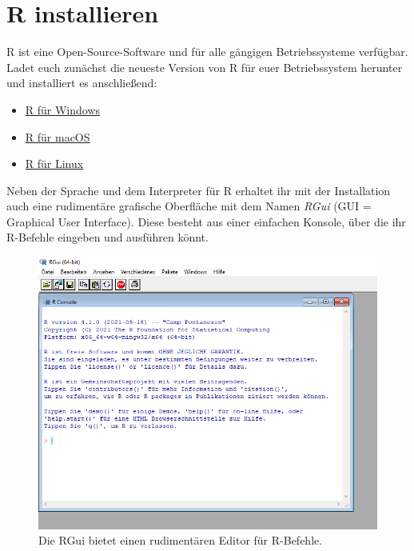 \documentclass[
]{book}
\providecommand{\tightlist}{%
  \setlength{\itemsep}{0pt}\setlength{\parskip}{0pt}}
\begin{document}
\hypertarget{r-installieren}{%
\section{R installieren}\label{r-installieren}}

R ist eine Open-Source-Software und für alle gängigen Betriebssysteme verfügbar. Ladet euch zunächst die neueste Version von R für euer Betriebssystem herunter und installiert es anschließend:

\begin{itemize}
\tightlist
\item
  \href{https://cran.r-project.org/bin/windows/base/}{R für Windows}
\item
  \href{https://cran.r-project.org/bin/macosx/}{R für macOS}
\item
  \href{https://cran.r-project.org/bin/linux/}{R für Linux}
\end{itemize}

Neben der Sprache und dem Interpreter für R erhaltet ihr mit der Installation auch eine rudimentäre grafische Oberfläche mit dem Namen \emph{RGui} (GUI = Graphical User Interface). Diese besteht aus einer einfachen Konsole, über die ihr R-Befehle eingeben und ausführen könnt.

\begin{figure}
\includegraphics[width=1\linewidth]{fig/screenshot_r_console} \caption{Die RGui bietet einen rudimentären Editor für R-Befehle.}\label{fig:screenshot-r-console}
\end{figure}
\end{document}

